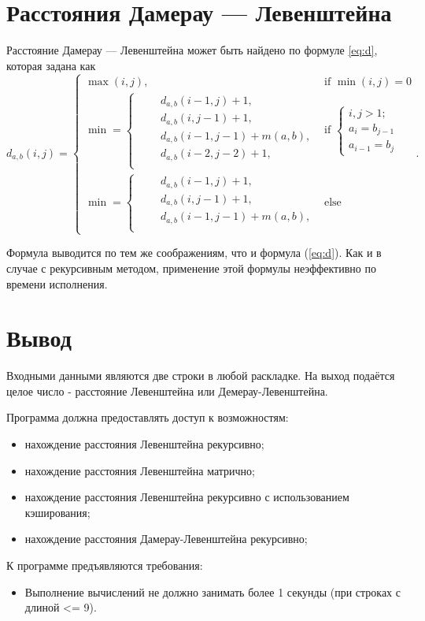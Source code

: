 \section{Расстояния Дамерау — Левенштейна}

Расстояние Дамерау — Левенштейна может быть найдено по формуле \ref{eq:d}, которая задана как
\begin{equation}
	\label{eq:d}
	d_{a,b}(i, j) = \begin{cases}
		\max(i, j), &\text{if }\min(i, j) = 0\\
		\min = \begin{cases} 
			\qquad d_{a,b}(i-1, j) + 1,\\
			\qquad d_{a,b}(i, j-1) + 1,\\
			\qquad d_{a,b}(i-1, j-1) + m(a,b),\\
			\qquad d_{a,b}(i-2, j-2) + 1,\\
		\end{cases} &\text{if } \begin{cases}i,j > 1;\\a_{i} = b_{j-1}\\ a_{i-1} = b_{j}\end{cases} \\
		\min = \begin{cases} 
			\qquad d_{a,b}(i-1, j) + 1,\\
			\qquad d_{a,b}(i, j-1) + 1,\\
			\qquad d_{a,b}(i-1, j-1) + m(a,b),\\
		\end{cases} &\text{else }
		\end{cases}.
\end{equation}

Формула выводится по тем же соображениям, что и формула (\ref{eq:d}).
Как и в случае с рекурсивным методом, применение этой формулы неэффективно по времени исполнения.

\section*{Вывод}

Входными данными являются две строки в любой раскладке. 
На выход подаётся целое число - расстояние Левенштейна или Демерау-Левенштейна.


Программа должна предоставлять доступ к возможностям:
\begin{itemize}
	\item нахождение расстояния Левенштейна рекурсивно;
	\item нахождение расстояния Левенштейна матрично;
	\item нахождение расстояния Левенштейна рекурсивно с использованием кэширования;
	\item нахождение расстояния Дамерау-Левенштейна рекурсивно;
\end{itemize}


К программе предъявляются требования:
\begin{itemize}
	\item Выполнение вычислений не должно занимать более 1 секунды (при строках с длиной <= 9).
\end{itemize}